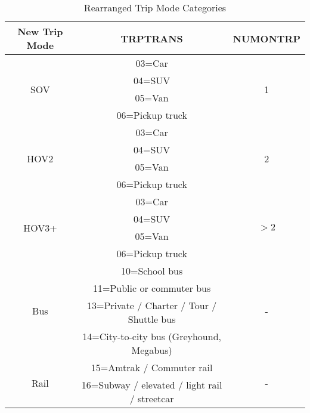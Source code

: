 \begin{table}[h!]
    \centering
    \caption{Rearranged Trip Mode Categories}
    \label{tab:rearranged_modes}
    \begin{tabular}{ccc}
        \toprule
        \textbf{New Trip Mode} & \textbf{TRPTRANS} & \textbf{NUMONTRP} \\
        \midrule
        \multirow{4}{*}{SOV}      & 03=Car            & \multirow{4}{*}{1}  \\
                                  & 04=SUV            &                     \\
                                  & 05=Van            &                     \\
                                  & 06=Pickup truck   &                     \\
        \midrule
        \multirow{4}{*}{HOV2}     & 03=Car            & \multirow{4}{*}{2}  \\
                                  & 04=SUV            &                     \\
                                  & 05=Van            &                     \\
                                  & 06=Pickup truck   &                     \\
        \midrule
        \multirow{4}{*}{HOV3+}    & 03=Car            & \multirow{4}{*}{\(>2\)}  \\
                                  & 04=SUV            &                     \\
                                  & 05=Van            &                     \\
                                  & 06=Pickup truck   &                     \\
        \midrule
        \multirow{4}{*}{Bus}      & 10=School bus     & \multirow{4}{*}{\--} \\
                                  & 11=Public or commuter bus &                     \\
                                  & 13=Private / Charter / Tour / Shuttle bus &                     \\
                                  & 14=City-to-city bus (Greyhound, Megabus) &                     \\
        \midrule
        \multirow{2}{*}{Rail}     & 15=Amtrak / Commuter rail & \multirow{2}{*}{\--} \\
                                  & 16=Subway / elevated / light rail / streetcar &                     \\

\end{tabular}
\end{table}
